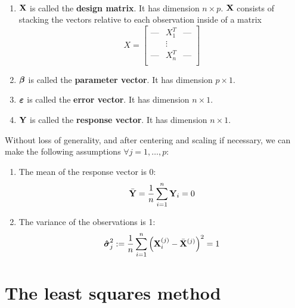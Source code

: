 \begin{definition}\
    \begin{enumerate}[label=(\alph*)]
        \item $\mathbf{X}$ is called the \textbf{design matrix}. It has dimension $n \times p$. $\mathbf{X}$ consists of stacking the vectors relative to each observation inside of a matrix
              \[
                  X =
                  \begin{bmatrix}
                      \text{---} & X_1^T  & \text{---} \\
                                 & \vdots &            \\
                      \text{---} & X_n^T  & \text{---} \\
                  \end{bmatrix}
              \]
        \item $\boldsymbol{\beta}$ is called the \textbf{parameter vector}. It has dimension $p \times 1$.
        \item $\boldsymbol{\varepsilon}$ is called the \textbf{error vector}. It has dimension $n \times 1$.
        \item $\mathbf{Y}$ is called the \textbf{response vector}. It has dimension $n \times 1$.
    \end{enumerate}
\end{definition}

Without loss of generality, and after centering and scaling if necessary, we can make the following assumptions \(\forall j = 1, \ldots, p\):

\begin{enumerate}
    \item The mean of the response vector is 0:
        \[
            \bar{\mathbf{Y}} = \frac{1}{n} \sum \limits_{i=1}^{n} \mathbf{Y}_{i} = 0
        \]
    \item The variance of the observations is 1:
        \[
            \boldsymbol{\hat{\sigma}}_{j}^{2} := \frac{1}{n} \sum \limits_{i=1}^{n} \left( \mathbf{X}_{i}^{(j)} - \bar{\mathbf{X}}^{(j)} \right)^{2} = 1
        \]
\end{enumerate}

\section{The least squares method}


